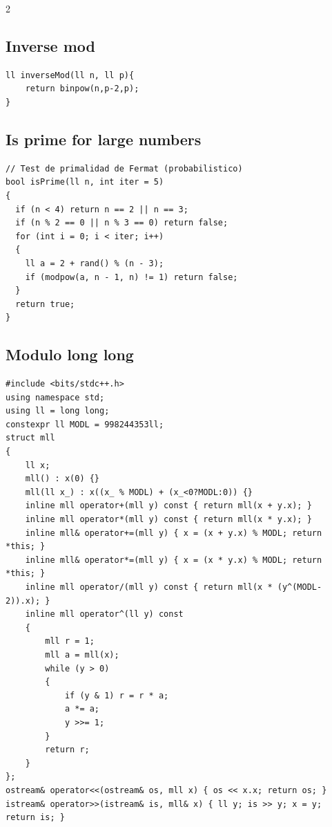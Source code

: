 \documentclass[twoside]{article}
\begin{document}
\begin{multicols*}{2}
	{
		\subsection*{Inverse mod}
	}
	\begin{verbatim}
ll inverseMod(ll n, ll p){
    return binpow(n,p-2,p);
}

\end{verbatim}

	{
		\subsection*{Is prime for large numbers}
	}
	\begin{verbatim}
// Test de primalidad de Fermat (probabilistico)
bool isPrime(ll n, int iter = 5)
{
  if (n < 4) return n == 2 || n == 3;
  if (n % 2 == 0 || n % 3 == 0) return false;
  for (int i = 0; i < iter; i++)
  {
    ll a = 2 + rand() % (n - 3);
    if (modpow(a, n - 1, n) != 1) return false;
  }
  return true;
}
\end{verbatim}

	{
		\subsection*{Modulo long long}
	}
	\begin{verbatim}
#include <bits/stdc++.h>
using namespace std;
using ll = long long;
constexpr ll MODL = 998244353ll;
struct mll
{
    ll x;
    mll() : x(0) {}
    mll(ll x_) : x((x_ % MODL) + (x_<0?MODL:0)) {}
    inline mll operator+(mll y) const { return mll(x + y.x); }
    inline mll operator*(mll y) const { return mll(x * y.x); }
    inline mll& operator+=(mll y) { x = (x + y.x) % MODL; return *this; }
    inline mll& operator*=(mll y) { x = (x * y.x) % MODL; return *this; }
    inline mll operator/(mll y) const { return mll(x * (y^(MODL-2)).x); }
    inline mll operator^(ll y) const
    {
        mll r = 1;
        mll a = mll(x);
        while (y > 0)
        {
            if (y & 1) r = r * a;
            a *= a;
            y >>= 1;
        }
        return r;
    }
};
ostream& operator<<(ostream& os, mll x) { os << x.x; return os; }
istream& operator>>(istream& is, mll& x) { ll y; is >> y; x = y; return is; }


\end{verbatim}
\end{multicols*}
\end{document}
